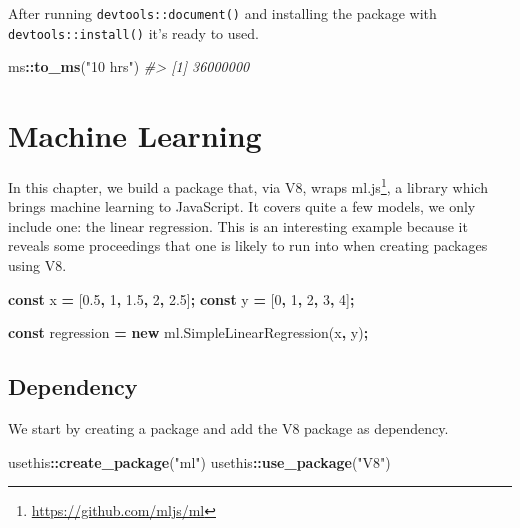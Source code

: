 \documentclass[10pt,]{krantz}
\makeatletter
\newenvironment{Shaded}{\begin{snugshade}}{\end{snugshade}}
\newcommand{\AttributeTok}[1]{\textcolor[rgb]{0.61,0.61,0.61}{#1}}
\newcommand{\CommentTok}[1]{\textcolor[rgb]{0.37,0.37,0.37}{\textit{#1}}}
\newcommand{\DecValTok}[1]{\textcolor[rgb]{0.06,0.06,0.06}{#1}}
\newcommand{\FloatTok}[1]{\textcolor[rgb]{0.06,0.06,0.06}{#1}}
\newcommand{\KeywordTok}[1]{\textcolor[rgb]{0.27,0.27,0.27}{\textbf{#1}}}
\newcommand{\NormalTok}[1]{#1}
\newcommand{\OperatorTok}[1]{\textcolor[rgb]{0.43,0.43,0.43}{\textbf{#1}}}
\newcommand{\StringTok}[1]{\textcolor[rgb]{0.5,0.5,0.5}{#1}}
\newcommand{\VariableTok}[1]{\textcolor[rgb]{0,0,0}{#1}}
\renewcommand{\href}[2]{#2\footnote{\url{#1}}}
\newenvironment{kframe}{%
\medskip{}
\setlength{\fboxsep}{.8em}
 \def\at@end@of@kframe{}%
 \ifinner\ifhmode%
  \def\at@end@of@kframe{\end{minipage}}%
  \begin{minipage}{\columnwidth}%
 \fi\fi%
 \def\FrameCommand##1{\hskip\@totalleftmargin \hskip-\fboxsep
 \colorbox{shadecolor}{##1}\hskip-\fboxsep
     \hskip-\linewidth \hskip-\@totalleftmargin \hskip\columnwidth}%
 \MakeFramed {\advance\hsize-\width
   \@totalleftmargin\z@ \linewidth\hsize
   \@setminipage}}%
 {\par\unskip\endMakeFramed%
 \at@end@of@kframe}
\renewenvironment{Shaded}{\begin{kframe}}{\end{kframe}}
\makeatother
\begin{document}
After running \texttt{devtools::document()} and installing the package with \texttt{devtools::install()} it's ready to used.

\begin{Shaded}
\begin{Highlighting}[]
\NormalTok{ms}\OperatorTok{::}\KeywordTok{to_ms}\NormalTok{(}\StringTok{"10 hrs"}\NormalTok{)}
\CommentTok{#> [1] 36000000}
\end{Highlighting}
\end{Shaded}

\hypertarget{v8-ml}{%
\chapter{Machine Learning}\label{v8-ml}}

In this chapter, we build a package that, via V8, wraps \href{https://github.com/mljs/ml}{ml.js}, a library which brings machine learning to JavaScript. It covers quite a few models, we only include one: the linear regression. This is an interesting example because it reveals some proceedings that one is likely to run into when creating packages using V8.

\begin{Shaded}
\begin{Highlighting}[]
\KeywordTok{const}\NormalTok{ x }\OperatorTok{=}\NormalTok{ [}\FloatTok{0.5}\OperatorTok{,} \DecValTok{1}\OperatorTok{,} \FloatTok{1.5}\OperatorTok{,} \DecValTok{2}\OperatorTok{,} \FloatTok{2.5}\NormalTok{]}\OperatorTok{;}
\KeywordTok{const}\NormalTok{ y }\OperatorTok{=}\NormalTok{ [}\DecValTok{0}\OperatorTok{,} \DecValTok{1}\OperatorTok{,} \DecValTok{2}\OperatorTok{,} \DecValTok{3}\OperatorTok{,} \DecValTok{4}\NormalTok{]}\OperatorTok{;}

\KeywordTok{const}\NormalTok{ regression }\OperatorTok{=} \KeywordTok{new} \VariableTok{ml}\NormalTok{.}\AttributeTok{SimpleLinearRegression}\NormalTok{(x}\OperatorTok{,}\NormalTok{ y)}\OperatorTok{;}
\end{Highlighting}
\end{Shaded}

\hypertarget{v8-ml-dependency}{%
\section{Dependency}\label{v8-ml-dependency}}

We start by creating a package and add the V8 package as dependency.

\begin{Shaded}
\begin{Highlighting}[]
\NormalTok{usethis}\OperatorTok{::}\KeywordTok{create_package}\NormalTok{(}\StringTok{"ml"}\NormalTok{)}
\NormalTok{usethis}\OperatorTok{::}\KeywordTok{use_package}\NormalTok{(}\StringTok{"V8"}\NormalTok{)}
\end{Highlighting}
\end{Shaded}
\end{document}
